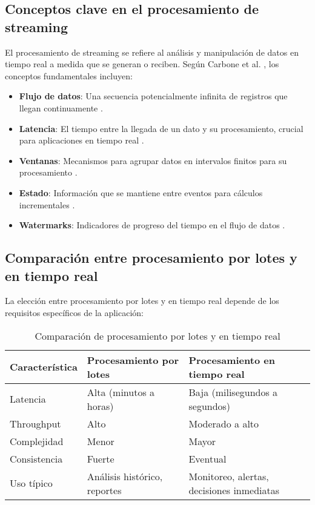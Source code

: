 \subsection{Conceptos clave en el procesamiento de streaming}

El procesamiento de streaming se refiere al análisis y manipulación de datos en tiempo real a medida que se generan o reciben. Según Carbone et al. \parencite{carbone2015apache}, los conceptos fundamentales incluyen:

\begin{itemize}
    \item \textbf{Flujo de datos}: Una secuencia potencialmente infinita de registros que llegan continuamente \parencite{akidau2015dataflow}.
    \item \textbf{Latencia}: El tiempo entre la llegada de un dato y su procesamiento, crucial para aplicaciones en tiempo real \parencite{akidau2015dataflow}.
    \item \textbf{Ventanas}: Mecanismos para agrupar datos en intervalos finitos para su procesamiento \parencite{akidau2015dataflow}.
    \item \textbf{Estado}: Información que se mantiene entre eventos para cálculos incrementales \parencite{carbone2015apache}.
    \item \textbf{Watermarks}: Indicadores de progreso del tiempo en el flujo de datos \parencite{akidau2015dataflow}.
\end{itemize}

\subsection{Comparación entre procesamiento por lotes y en tiempo real}

La elección entre procesamiento por lotes y en tiempo real depende de los requisitos específicos de la aplicación:

\begin{table}[h]
\centering
\begin{tabular}{|p{3cm}|p{5cm}|p{5cm}|}
\hline
\textbf{Característica} & \textbf{Procesamiento por lotes} & \textbf{Procesamiento en tiempo real} \\
\hline
Latencia & Alta (minutos a horas) & Baja (milisegundos a segundos) \\
\hline
Throughput & Alto & Moderado a alto \\
\hline
Complejidad & Menor & Mayor \\
\hline
Consistencia & Fuerte & Eventual \\
\hline
Uso típico & Análisis histórico, reportes & Monitoreo, alertas, decisiones inmediatas \\
\hline
\end{tabular}
\caption{Comparación de procesamiento por lotes y en tiempo real}
\label{tab:batch_vs_streaming}
\end{table}

